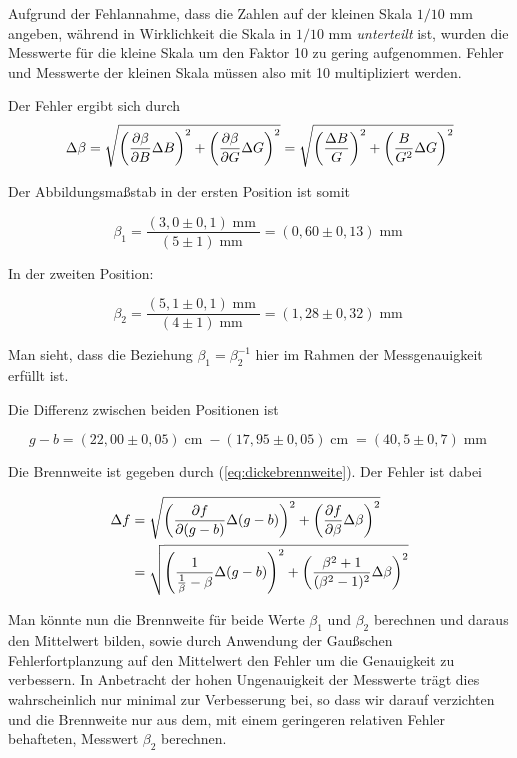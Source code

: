 \documentclass[a4paper,german,12pt,smallheadings]{scrartcl}
\begin{document}
Aufgrund der Fehlannahme, dass die Zahlen auf der kleinen Skala $1/10$ mm
angeben, während in Wirklichkeit die Skala in $1/10$ mm \textit{unterteilt}
ist, wurden die Messwerte für die kleine Skala um den Faktor 10 zu gering
aufgenommen. Fehler und Messwerte der kleinen Skala müssen also mit 10
multipliziert werden.

Der Fehler ergibt sich durch
\begin{equation*}
  \Delta \beta
  = \sqrt{
    \del{\frac{\partial \beta}{\partial B} \Delta B}^2 +
    \del{\frac{\partial \beta}{\partial G} \Delta G}^2
  }
  = \sqrt{
    \del{\frac{\Delta B}{G}}^2 +
    \del{\frac{B}{G^2} \Delta G}^2
  }
\end{equation*}

Der Abbildungsmaßstab in der ersten Position ist somit

\begin{equation}
  \beta_1 = \frac{(3{,}0 \pm 0{,}1) \operatorname{mm}}{(5\pm1) \operatorname{mm}} = (0{,}60\pm0{,}13) \operatorname{mm}
\end{equation}

In der zweiten Position:

\begin{equation}
  \beta_2 = \frac{(5{,}1\pm0{,}1) \operatorname{mm}}{(4\pm1) \operatorname{mm}} = (1{,}28\pm 0{,}32) \operatorname{mm}
\end{equation}

Man sieht, dass die Beziehung $\beta_1 = \beta_2^{-1}$ hier im Rahmen der
Messgenauigkeit erfüllt ist.

Die Differenz zwischen beiden Positionen ist

\begin{equation}
  g - b = (22{,}00 \pm 0{,}05) \operatorname{cm}
        - (17{,}95 \pm 0{,}05) \operatorname{cm} = (40{,}5 \pm 0{,}7) \operatorname{mm}
\end{equation}

Die Brennweite ist gegeben durch (\ref{eq:dickebrennweite}). Der Fehler ist
dabei

\begin{align*}
  \Delta f &= \sqrt{
    \del{\frac{\partial f}{\partial (g-b)} \Delta(g-b)}^2 +
    \del{\frac{\partial f}{\partial \beta} \Delta \beta}^2
  } \\
  &= \sqrt{
    \del{\frac{1}{\frac{1}{\beta} - \beta} \Delta(g-b)}^2 +
    \del{\frac{\beta^2 + 1}{(\beta^2 -1)^2} \Delta \beta}^2
  }
\end{align*}

Man könnte nun die Brennweite für beide Werte $\beta_1$ und $\beta_2$ berechnen
und daraus den Mittelwert bilden, sowie durch Anwendung der Gaußschen
Fehlerfortplanzung auf den Mittelwert den Fehler um die Genauigkeit zu
verbessern. In Anbetracht der hohen Ungenauigkeit der Messwerte trägt dies
wahrscheinlich nur minimal zur Verbesserung bei, so dass wir darauf verzichten
und die Brennweite nur aus dem, mit einem geringeren relativen Fehler
behafteten, Messwert $\beta_2$ berechnen.
\end{document}
